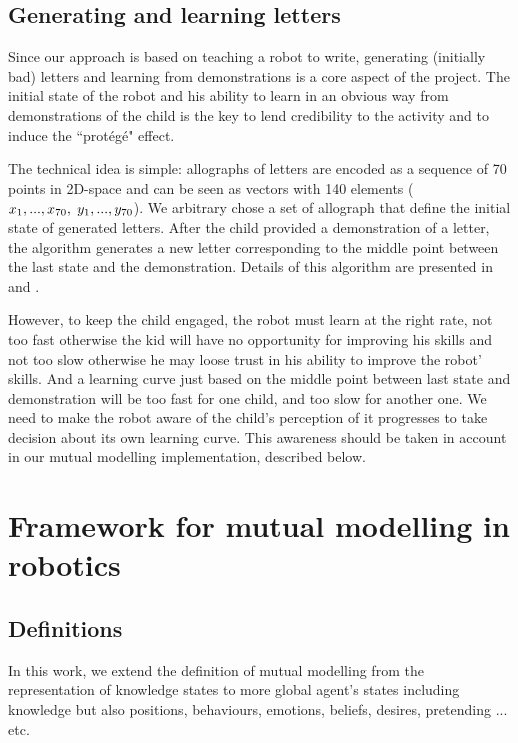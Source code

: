 \documentclass[10pt,a4paper,twocolumn]{article}
\begin{document}
\subsection{Generating and learning letters}

Since our approach is based on teaching a robot to write, generating (initially
bad) letters and learning from demonstrations is a core aspect of the project.
The initial state of the robot and his ability to learn in an obvious way
from demonstrations of the child is the key to lend credibility to the activity and to induce the ``prot\'eg\'e" effect.

The technical idea is simple: allographs of letters are encoded as a sequence of 70 points in
2D-space and can be seen as vectors with 140 elements
($x_1,...,x_{70},\hspace{1mm}y_1,...,y_{70}$). We arbitrary chose a set of allograph
that define the initial state of generated letters. 
After the child provided a demonstration of a letter, the algorithm
generates a new letter corresponding to the middle point between the last state and the
demonstration. Details of this algorithm are presented in \cite{Hood} and \cite{jacq2016building}.

However, to keep the child engaged, the robot must learn at the right rate, not too fast otherwise the kid will have
no opportunity for improving his skills and not too slow otherwise he may loose
trust in his ability to improve the robot' skills. And a learning curve just based on the middle point between last state and demonstration will be too fast for one child, and too slow for another one. We need to make the robot aware of the child's perception of it progresses to take decision about its own learning curve. This awareness should be taken in account in our mutual modelling implementation, described below. 


\section{Framework for mutual modelling in robotics}

\subsection{Definitions}
In this work, we extend the definition of mutual modelling from the representation of knowledge states to more global agent's states including knowledge but also positions, behaviours, emotions, beliefs, desires, pretending ... etc. 
\end{document}
